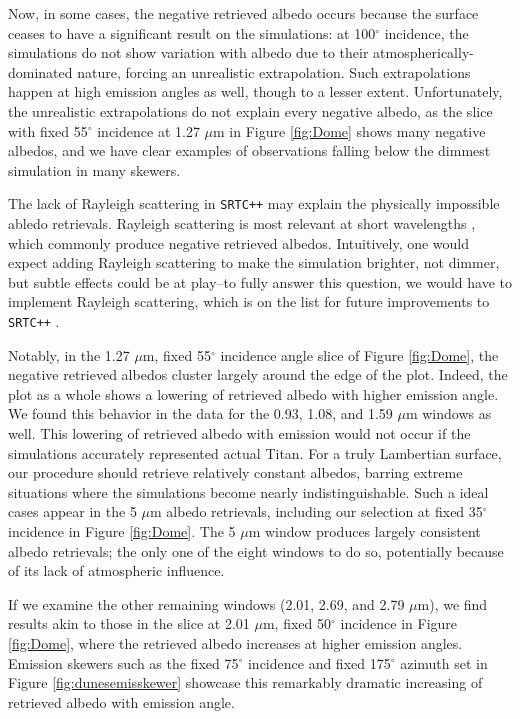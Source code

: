 \documentclass[twocolumn,linenumbers]{aastex631}
\def\srtcppspace{{\tt SRTC++} }
\begin{document}
Now, in some cases, the negative retrieved albedo occurs because the surface ceases to have a significant result on the simulations: at 100$^{\circ}$ incidence, the simulations do not show variation with albedo due to their atmospherically-dominated nature, forcing an unrealistic extrapolation. Such extrapolations happen at high emission angles as well, though to a lesser extent. Unfortunately, the unrealistic extrapolations do not explain every negative albedo, as the slice with fixed 55$^{\circ}$ incidence at 1.27 $\mu$m in Figure \ref{fig:Dome} shows many negative albedos, and we have clear examples of observations falling below the dimmest simulation in many skewers.

The lack of Rayleigh scattering in \srtcppspace  may explain the physically impossible abledo retrievals. Rayleigh scattering is most relevant at short wavelengths \citep{EsSayeh2023}, which commonly produce negative retrieved albedos. Intuitively, one would expect adding Rayleigh scattering to make the simulation brighter, not dimmer, but subtle effects could be at play--to fully answer this question, we would have to implement Rayleigh scattering, which is on the list for future improvements to \srtcppspace.

Notably, in the 1.27 $\mu$m, fixed 55$^{\circ}$ incidence angle slice of Figure \ref{fig:Dome}, the negative retrieved albedos cluster largely around the edge of the plot. Indeed, the plot as a whole shows a lowering of retrieved albedo with higher emission angle. We found this behavior in the data for the 0.93, 1.08, and 1.59 $\mu$m windows as well. This lowering of retrieved albedo with emission would not occur if the simulations accurately represented actual Titan. For a truly Lambertian surface, our procedure should retrieve relatively constant albedos, barring extreme situations where the simulations become nearly indistinguishable. Such a ideal cases appear in the 5 $\mu$m albedo retrievals, including our selection at fixed 35$^{\circ}$ incidence in Figure \ref{fig:Dome}. The 5 $\mu$m window produces largely consistent albedo retrievals; the only one of the eight windows to do so, potentially because of its lack of atmospheric influence.

If we examine the other remaining windows (2.01, 2.69, and 2.79 $\mu$m), we find results akin to those in the slice at 2.01 $\mu$m, fixed 50$^{\circ}$ incidence in Figure \ref{fig:Dome}, where the retrieved albedo increases at higher emission angles. Emission skewers such as the fixed 75$^{\circ}$ incidence and fixed 175$^{\circ}$ azimuth set in Figure \ref{fig:dunesemisskewer} showcase this remarkably dramatic increasing of retrieved albedo with emission angle.
\end{document}
